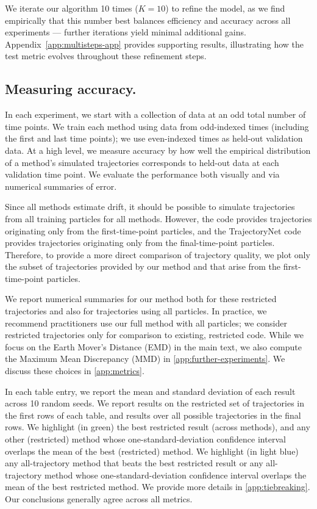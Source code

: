 We iterate our algorithm 10 times ($K = 10$) to refine the model, as we find empirically that this number best balances efficiency and accuracy across all experiments --- further iterations yield minimal additional gains. Appendix~\ref{app:multisteps-app} provides supporting results, illustrating how the test metric evolves throughout these refinement steps.





\subsection{Measuring accuracy.} In each experiment, we start with a collection of data at an odd total number of time points. We train each method using data from odd-indexed times (including the first and last time points); we use even-indexed times as held-out validation data. At a high level, we measure accuracy by how well the empirical distribution of a method's simulated trajectories corresponds to held-out data at each validation time point. We evaluate the performance both visually and via numerical summaries of error. 

Since all methods estimate drift, it should be possible to simulate trajectories from all training particles for all methods. However, the \dmsbname{} code provides trajectories originating only from the first-time-point particles, and the TrajectoryNet code provides trajectories originating only from the final-time-point particles. Therefore, to provide a more direct comparison of trajectory quality, we plot only the subset of trajectories provided by our method and \vanilla{} that arise from the first-time-point particles.

We report numerical summaries for our method both for these restricted trajectories and also for trajectories using all particles. In practice, we recommend practitioners use our full method with all particles; we consider restricted trajectories only for comparison to existing, restricted code.
While we focus on the Earth Mover's Distance (EMD) in the main text, we also compute the Maximum Mean Discrepancy (MMD) in \cref{app:further-experiments}. We discuss these choices in \cref{app:metrics}.

In each table entry, we report the mean and standard deviation of each result across 10 random seeds.
We report results on the restricted set of trajectories in the first rows of each table, and results over all possible trajectories in the final rows.
We highlight (in green) the best restricted result (across methods), and any other (restricted) method whose one-standard-deviation confidence interval
overlaps the mean of the best (restricted) method. We highlight (in light blue) any all-trajectory method that beats the best restricted result or any all-trajectory method whose one-standard-deviation confidence interval
overlaps the mean of the best restricted method. We provide more details in \cref{app:tiebreaking}. Our conclusions generally agree across all metrics.

